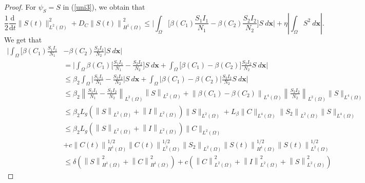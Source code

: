 \documentclass[10pt,number,preprint,times]{elsarticle}
\numberwithin{equation}{section} %
\begin{document}
\begin{proof}
		\noindent For $\psi_S=S$ in (\ref{uni3}), we obtain that 
		\begin{equation}\label{estmS0}
			\displaystyle \frac{1}{2}\frac{\mathrm{d}}{\mathrm{d} t}\|S(t)\|_{L^2(\Omega)}^{2}+D_C\left\|S(t)\right\|_{H^{1}(\Omega)}^{2}\leq  \Big|\int_{\Omega}\Big[\beta(C_1)\frac{S_1 I_1}{N_1}-\beta(C_2)\frac{S_2 I_2}{N_2}\Big] S~d{\mathbf{x}}\Big| +\eta\left|\int_{\Omega} S^2~d{\mathbf{x}} \right|.
		\end{equation}
		We get that
		\begin{equation*}
			\begin{split}
				\Big|\int_{\Omega}\Big[\beta(C_1)\frac{S_1 I_1}{N_1}&-\beta(C_2)\frac{S_2 I_2}{N_2}\Big] S~d{\mathbf{x}}\Big|
				\\&=\Big|\int_{\Omega}\beta(C_1)\Big[\frac{S_1 I_1}{N_1}-\frac{S_2 I_2}{N_2}\Big] S~d{\mathbf{x}}+\int_{\Omega}\Big[\beta(C_1)-\beta(C_2)\Big]\frac{S_2 I_2}{N_2} S~d{\mathbf{x}}\Big|
				\\&\leq \beta_2\int_{\Omega}\Big|\frac{S_1 I_1}{N_1}-\frac{S_2 I_2}{N_2}\Big| S~d{\mathbf{x}}+\int_{\Omega}\Big|\beta(C_1)-\beta(C_2)\Big|\frac{S_2 I_2}{N_2} S~d{\mathbf{x}}\Big|
				\\&\leq\beta_2\left\|\frac{S_1 I_1}{N_1}-\frac{S_2 I_2}{N_2}\right\|_{L^{2}(\Omega)}\left\|S\right\|_{L^{2}(\Omega)}+ \left\|\beta(C_1)-\beta(C_2)\right\|_{L^{4}(\Omega)} \left\|\frac{S_2 I_2}{N_2}\right\|_{L^{2}(\Omega)} \|S\|_{L^{4}(\Omega)}
				\\&\leq \beta_2 L_g(\left\|S\right\|_{L^{2}(\Omega)}+\left\|I\right\|_{L^{2}(\Omega)})\|S\|_{L^{2}(\Omega)}+ L_{\beta}\|C\|_{L^{4}(\Omega)}\left\|S_2\right\|_{L^{2}(\Omega)} \|S\|_{L^{4}(\Omega)}
				\\&\leq \beta_2 L_g(\left\|S\right\|_{L^{2}(\Omega)}+\left\|I\right\|_{L^{2}(\Omega)})\|C\|_{L^{2}(\Omega)}
				\\
			    &+ c\left\|C(t)\right\|_{H^{1}(\Omega)}^{1/2}\left\|C(t)\right\|_{L^{2}(\Omega)}^{1/2}\left\|S_2\right\|_{L^{2}(\Omega)} \left\|S(t)\right\|_{H^{1}(\Omega)}^{1/2}\left\|S(t)\right\|_{L^{2}(\Omega)}^{1/2}
				\\&\leq \delta \left(\left\|S\right\|_{H^{1}(\Omega)}^2+\left\|C\right\|_{H^{1}(\Omega)}^2\right)+c\left( \left\|C\right\|_{L^{2}(\Omega)}^2+\left\|I\right\|_{L^{2}(\Omega)}^2+\left\|S\right\|_{L^{2}(\Omega)}^2\right)

\end{split}
\end{equation*}
\end{proof}
\end{document}
